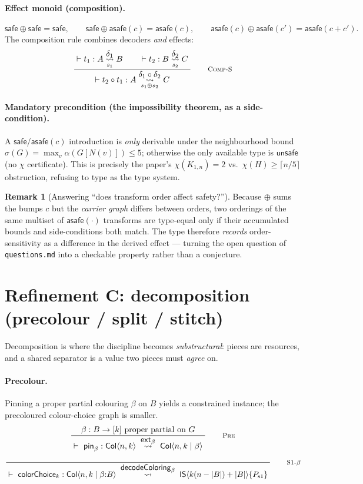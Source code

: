 \documentclass[11pt]{article}
\theoremstyle{definition}
\newtheorem{remark}[theorem]{Remark}
\newcommand{\rn}[1]{\textsc{\footnotesize #1}}
\newcommand{\irule}[2]{\ensuremath{\dfrac{\;#1\;}{\;#2\;}}}
\newcommand{\redto}[1]{\mathrel{\overset{\textstyle #1}{\rightsquigarrow}}}
\newcommand{\redtos}[2]{\mathrel{\overset{\textstyle #1}{\underset{#2}{\rightsquigarrow}}}}
\newcommand{\Col}{\mathsf{Col}}
\newcommand{\IS}{\mathsf{IS}}
\newcommand{\alphacol}{\alpha}
\newcommand{\safe}{\textsf{safe}}
\newcommand{\asafe}[1]{\textsf{asafe}(#1)}
\begin{document}
\paragraph{Effect monoid (composition).}
\[
  \safe\oplus\safe=\safe,\qquad
  \safe\oplus\asafe{c}=\asafe{c},\qquad
  \asafe{c}\oplus\asafe{c'}=\asafe{c+c'} .
\]
The composition rule combines decoders \emph{and} effects:
\[
  \irule{\vdash t_1 : A \redtos{\delta_1}{s_1} B \qquad \vdash t_2 : B \redtos{\delta_2}{s_2} C}
        {\vdash t_2\circ t_1 : A \redtos{\delta_1\circ\delta_2}{\,s_1\oplus s_2\,} C}
  \qquad\rn{Comp-S}
\]

\paragraph{Mandatory precondition (the impossibility theorem, as a side-condition).}
A $\safe$/$\asafe{c}$ introduction is \emph{only} derivable under the neighbourhood
bound $\sigma(G)=\max_v\alphacol(G[N(v)])\le 5$; otherwise the only available type
is $\textsf{unsafe}$ (no $\chi$ certificate). This is precisely the paper's
$\chi(K_{1,n})=2$ vs.\ $\chi(H)\ge\lceil n/5\rceil$ obstruction, refusing to type as
the type system.

\begin{remark}[Answering ``does transform order affect safety?'']
Because $\oplus$ sums the bumps $c$ but the \emph{carrier graph} differs between
orders, two orderings of the same multiset of $\asafe{\cdot}$ transforms are
type-equal only if their accumulated bounds and side-conditions both match. The
type therefore \emph{records} order-sensitivity as a difference in the derived
effect --- turning the open question of \texttt{questions.md} into a checkable
property rather than a conjecture.
\end{remark}

\section{Refinement C: decomposition (precolour / split / stitch)}
\label{sec:decomp}

Decomposition is where the discipline becomes \emph{substructural}: pieces are
resources, and a shared separator is a value two pieces must \emph{agree} on.

\paragraph{Precolour.} Pinning a proper partial colouring $\beta$ on $B$ yields a
constrained instance; the precoloured colour-choice graph is smaller.
\[
  \irule{\beta:B\to[k]\ \text{proper partial on } G}
        {\vdash\ \mathsf{pin}_\beta : \Col\langle n,k\rangle \;\redto{\mathsf{ext}_\beta}\; \Col\langle n,k\mid\beta\rangle}
  \qquad\rn{Pre}
\]
\[
  \irule{\ }
        {\vdash\ \mathsf{colorChoice}_k : \Col\langle n,k\mid\beta{:}B\rangle
          \;\redto{\mathsf{decodeColoring}_\beta}\;
          \IS\langle k(n-|B|)+|B|\rangle\{P_{\mathrm{s1}}\}}
  \qquad\rn{S1-$\beta$}
\]
\end{document}
